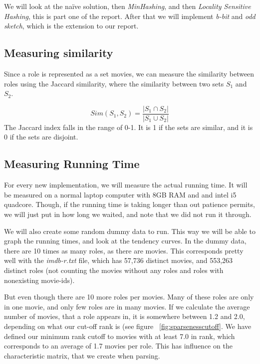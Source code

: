 \documentclass[a4paper,11pt]{article}
\begin{document}

We will look at the naïve solution, then \emph{MinHashing}, and then \emph{Locality Sensitive Hashing}, this is part one of the report. After that we will implement \emph{b-bit} and \emph{odd sketch}, which is the extension to our report.


\subsection{Measuring similarity}
Since a role is represented as a set movies, we can measure the similarity between roles using the Jaccard similarity, where the similarity between two sets $S_1$ and $S_2$.

\begin{equation}
Sim(S_1, S_2) = \frac{|S_1 \cap S_2|}{|S_1 \cup S_2|}
\end{equation}
The Jaccard index falls in the range of 0-1. It is 1 if the sets are similar, and it is 0 if the sets are disjoint.


\subsection{Measuring Running Time}

For every new implementation, we will measure the actual running time. It will be measured on a normal laptop computer with 8GB RAM and and intel i5 quadcore. Though, if the running time is taking longer than out patience permits, we will just put in how long we waited, and note that we did not run it through.

We will also create some random dummy data to run. This way we will be able to graph the running times, and look at the tendency curves. In the dummy data, there are 10 times as many roles, as there are movies. This corresponds pretty well with the \emph{imdb-r.txt} file, which has 57,736 distinct movies, and 553,263 distinct roles (not counting the movies without any roles and roles with nonexisting movie-ids).

But even though there are 10 more roles per movies. Many of these roles are only in one movie, and only few roles are in many movies. If we calculate the average number of movies, that a role appears in, it is somewhere between 1.2 and 2.0, depending on what our cut-off rank is (see figure ~\ref{fig:sparsenesscutoff}. We have defined our minimum rank cutoff to movies with at least 7.0 in rank, which corresponds to an average of 1.7 movies per role. This has influence on the characteristic matrix, that we create when parsing.
\end{document}
